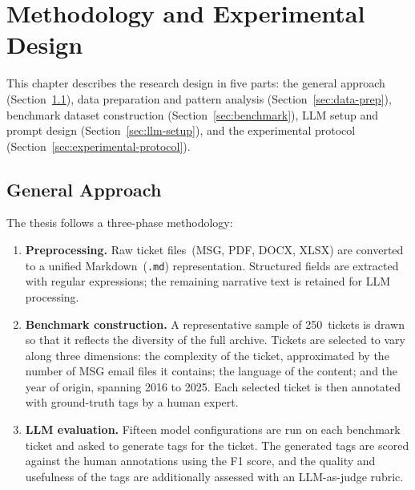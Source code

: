 \chapter{Methodology and Experimental Design}
%
\label{chap:Methodology}
%
This chapter describes the research design in five parts: the general approach
(Section~\ref{sec:approach}), data preparation and pattern analysis
(Section~\ref{sec:data-prep}), benchmark dataset construction
(Section~\ref{sec:benchmark}), LLM setup and prompt design
(Section~\ref{sec:llm-setup}), and the experimental protocol
(Section~\ref{sec:experimental-protocol}).

\section{General Approach}
\label{sec:approach}
%
The thesis follows a three-phase methodology:

\begin{enumerate}
    \item \textbf{Preprocessing.}  Raw ticket files~(MSG, PDF, DOCX, XLSX)
          are converted to a unified Markdown~(\texttt{.md}) representation.
          Structured fields are extracted with regular expressions; the remaining
          narrative text is retained for LLM processing.

    \item \textbf{Benchmark construction.}  A representative sample of
          250~tickets is drawn so that it reflects the diversity of the full
          archive.  Tickets are selected to vary along three dimensions: the
          complexity of the ticket, approximated by the number of MSG email
          files it contains; the language of the content; and the year of
          origin, spanning 2016 to 2025.  Each selected ticket is then annotated
          with ground-truth tags by a human expert.

    \item \textbf{LLM evaluation.}  Fifteen model configurations are run on each
          benchmark ticket and asked to generate tags for the ticket.  The
          generated tags are scored against the human annotations using the F1
          score, and the quality and usefulness of the tags are additionally
          assessed with an LLM-as-judge rubric.
\end{enumerate}

